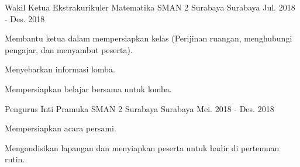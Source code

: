 

\begin{cventries}

  \cventry
    {Wakil Ketua} %
    {Ekstrakurikuler Matematika SMAN 2 Surabaya} %
    {Surabaya} %
    {Jul. 2018 - Des. 2018} %
    {
      \begin{cvitems} %
        \item {Membantu ketua dalam mempersiapkan kelas (Perijinan ruangan, menghubungi pengajar, dan menyambut peserta).}
        \item {Menyebarkan informasi lomba.}
        \item {Mempersiapkan belajar bersama untuk lomba.}
      \end{cvitems}
    }

  \cventry
    {Pengurus Inti} %
    {Pramuka SMAN 2 Surabaya} %
    {Surabaya} %
    {Mei. 2018 - Des. 2018} %
    {
      \begin{cvitems} %
        \item {Mempersiapkan acara persami.}
        \item {Mengondisikan lapangan dan menyiapkan peserta untuk hadir di pertemuan rutin.}
      \end{cvitems}
    }

\end{cventries}
